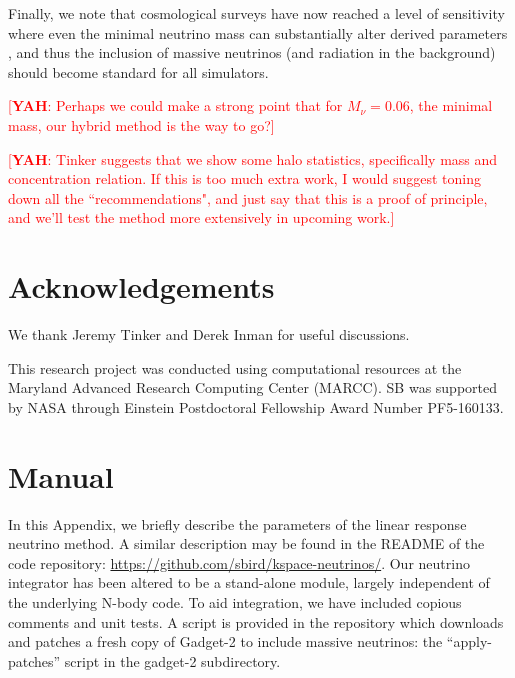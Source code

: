 \documentclass[useAMS, usenatbib]{mnras}
\newcommand{\yah}[1]{{\textcolor{red}{[{\bf YAH}: #1]}}}
\begin{document}
Finally, we note that cosmological surveys have now reached a level of sensitivity where even the minimal neutrino mass can substantially alter derived parameters \citep{Calabrese_2017}, and thus the inclusion of massive neutrinos (and radiation in the background) should become standard for all simulators.


\yah{Perhaps we could make a strong point that for $M_\nu = 0.06$, the minimal mass, our hybrid method is the way to go?}

\yah{Tinker suggests that we show some halo statistics, specifically mass and concentration relation. If this is too much extra work, I would suggest toning down all the ``recommendations", and just say that this is a proof of principle, and we'll test the method more extensively in upcoming work.}

\section*{Acknowledgements}

We thank Jeremy Tinker and Derek Inman for useful discussions.

This research project was conducted using computational resources
at the Maryland Advanced Research Computing Center (MARCC). SB was supported by NASA through
Einstein Postdoctoral Fellowship Award Number PF5-160133.

\appendix

\section{Manual}
\label{sec:manual}

In this Appendix, we briefly describe the parameters of the linear response neutrino method. A similar description may be found in the README of the code repository: \url{https://github.com/sbird/kspace-neutrinos/}. Our neutrino integrator has been altered to be a stand-alone module, largely independent of the underlying N-body code. To aid integration, we have included copious comments and unit tests. A script is provided in the repository which downloads and patches a fresh copy of Gadget-2 to include massive neutrinos: the ``apply-patches'' script in the gadget-2 subdirectory.
\end{document}
